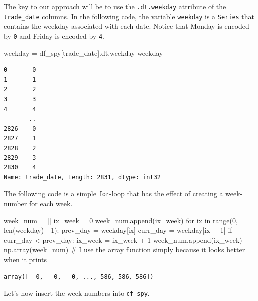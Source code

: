 \documentclass[
  letterpaper,
  DIV=11,
  numbers=noendperiod]{scrreprt}
\newenvironment{Shaded}{\begin{snugshade}}{\end{snugshade}}
\newcommand{\BuiltInTok}[1]{\textcolor[rgb]{0.00,0.23,0.31}{#1}}
\newcommand{\CommentTok}[1]{\textcolor[rgb]{0.37,0.37,0.37}{#1}}
\newcommand{\ControlFlowTok}[1]{\textcolor[rgb]{0.00,0.23,0.31}{#1}}
\newcommand{\DecValTok}[1]{\textcolor[rgb]{0.68,0.00,0.00}{#1}}
\newcommand{\KeywordTok}[1]{\textcolor[rgb]{0.00,0.23,0.31}{#1}}
\newcommand{\NormalTok}[1]{\textcolor[rgb]{0.00,0.23,0.31}{#1}}
\newcommand{\OperatorTok}[1]{\textcolor[rgb]{0.37,0.37,0.37}{#1}}
\newcommand{\StringTok}[1]{\textcolor[rgb]{0.13,0.47,0.30}{#1}}
\begin{document}
The key to our approach will be to use the \texttt{.dt.weekday}
attribute of the \texttt{trade\_date} columns. In the following code,
the variable \texttt{weekday} is a \texttt{Series} that contains the
weekday associated with each date. Notice that Monday is encoded by
\texttt{0} and Friday is encoded by \texttt{4}.

\begin{Shaded}
\begin{Highlighting}[]
\NormalTok{weekday }\OperatorTok{=}\NormalTok{ df\_spy[}\StringTok{\textquotesingle{}trade\_date\textquotesingle{}}\NormalTok{].dt.weekday}
\NormalTok{weekday}
\end{Highlighting}
\end{Shaded}

\begin{verbatim}
0       0
1       1
2       2
3       3
4       4
       ..
2826    0
2827    1
2828    2
2829    3
2830    4
Name: trade_date, Length: 2831, dtype: int32
\end{verbatim}

The following code is a simple \texttt{for}-loop that has the effect of
creating a week-number for each week.

\begin{Shaded}
\begin{Highlighting}[]
\NormalTok{week\_num }\OperatorTok{=}\NormalTok{ []}
\NormalTok{ix\_week }\OperatorTok{=} \DecValTok{0}
\NormalTok{week\_num.append(ix\_week)}
\ControlFlowTok{for}\NormalTok{ ix }\KeywordTok{in} \BuiltInTok{range}\NormalTok{(}\DecValTok{0}\NormalTok{, }\BuiltInTok{len}\NormalTok{(weekday) }\OperatorTok{{-}} \DecValTok{1}\NormalTok{):}
\NormalTok{    prev\_day }\OperatorTok{=}\NormalTok{ weekday[ix]}
\NormalTok{    curr\_day }\OperatorTok{=}\NormalTok{ weekday[ix }\OperatorTok{+} \DecValTok{1}\NormalTok{]}
    \ControlFlowTok{if}\NormalTok{ curr\_day }\OperatorTok{\textless{}}\NormalTok{ prev\_day:}
\NormalTok{        ix\_week }\OperatorTok{=}\NormalTok{ ix\_week }\OperatorTok{+} \DecValTok{1}
\NormalTok{    week\_num.append(ix\_week)}
\NormalTok{np.array(week\_num) }\CommentTok{\# I use the array function simply because it looks better when it prints}
\end{Highlighting}
\end{Shaded}

\begin{verbatim}
array([  0,   0,   0, ..., 586, 586, 586])
\end{verbatim}

Let's now insert the week numbers into \texttt{df\_spy}.
\end{document}
